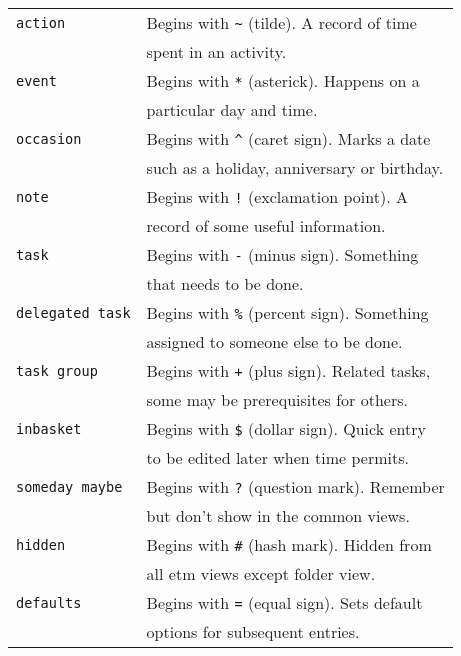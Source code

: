 \documentclass[10pt,landscape]{article}
\begin{document}
\begin{multicols}{3}
\begin{tabular}{@{}ll@{}}
\verb!action!  & Begins with \verb!~! (tilde). A record of time \\
               & spent in an activity. \\
\verb!event!   & Begins with \verb!*! (asterick). Happens on a \\
               & particular day and time. \\
\verb!occasion! & Begins with \verb!^! (caret sign). Marks a date \\
               & such as a  holiday, anniversary or birthday. \\
\verb!note!   & Begins with \verb'!' (exclamation point). A \\
              & record of some useful information. \\
\verb!task!   & Begins with \verb!-! (minus sign). Something  \\
              & that needs to be done. \\
\verb!delegated task!   & Begins with \verb!%! (percent sign). Something \\
              & assigned to someone else to be done. \\
\verb!task group!   & Begins with \verb!+! (plus sign). Related tasks, \\
              & some may be prerequisites for others. \\
\verb!inbasket!   & Begins with \verb!$! (dollar sign). Quick entry \\
              & to be edited later when time permits. \\
\verb!someday maybe!   & Begins with \verb!?! (question mark). Remember \\
              & but don't show in the common views. \\
\verb!hidden!   & Begins with \verb!#! (hash mark). Hidden from \\
              & all etm views except folder view. \\
\verb!defaults!   & Begins with \verb!=! (equal sign). Sets default \\
              & options for subsequent entries. \\
\end{tabular}



\end{multicols}
\end{document}
